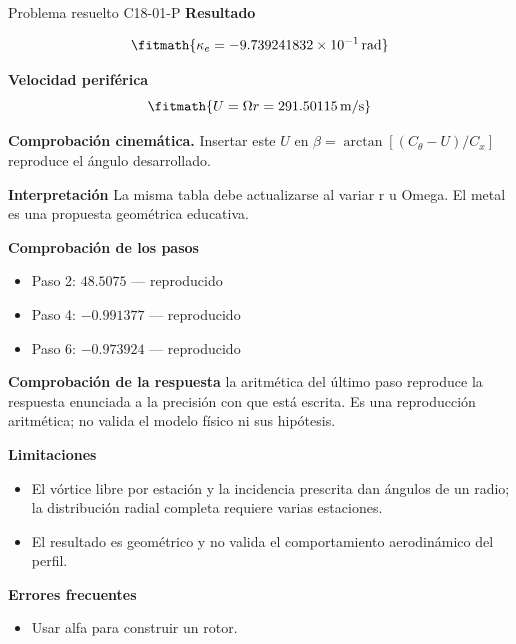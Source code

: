 \documentclass[10pt,openany]{book}
\begin{document}
\begin{studiumworked}{Problema resuelto C18-01-P}
\noindent\textbf{Resultado}

\[
\fitmath{\kappa_e=-9.739241832\times10^{-1}\,\mathrm{rad}}
\]

\noindent\textbf{Velocidad periférica}
\[
\fitmath{U=\Omega r=291.50115\,\mathrm{m/s}}
\]

\noindent\textbf{Comprobación cinemática.} Insertar este $U$ en $\beta=\arctan[(C_\theta-U)/C_x]$ reproduce el ángulo desarrollado.

\noindent\textbf{Interpretación}
La misma tabla debe actualizarse al variar r u Omega. El metal es una propuesta geométrica educativa.

\noindent\textbf{Comprobación de los pasos}
\begin{itemize}
\item Paso 2: $48.5075$ — reproducido
\item Paso 4: $-0.991377$ — reproducido
\item Paso 6: $-0.973924$ — reproducido
\end{itemize}

\noindent\textbf{Comprobación de la respuesta} la aritmética del último paso reproduce la respuesta enunciada a la precisión con que está escrita. Es una reproducción aritmética; no valida el modelo físico ni sus hipótesis.

\noindent\textbf{Limitaciones}
\begin{itemize}
\item El vórtice libre por estación y la incidencia prescrita dan ángulos de un radio; la distribución radial completa requiere varias estaciones.
\item El resultado es geométrico y no valida el comportamiento aerodinámico del perfil.
\end{itemize}

\noindent\textbf{Errores frecuentes}
\begin{itemize}
\item Usar alfa para construir un rotor.
\end{itemize}
\end{studiumworked}
\end{document}
